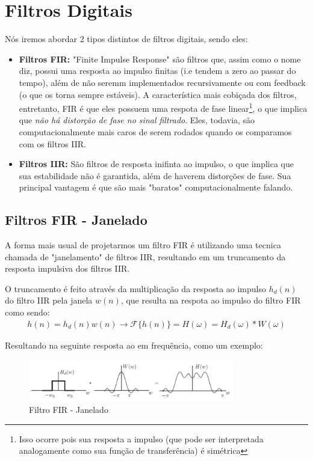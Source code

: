 \documentclass{article}
\begin{document}
\newpage
\section{Filtros Digitais}
Nós iremos abordar 2 tipos distintos de filtros digitais, sendo eles:
\begin{itemize}
    \item \textbf{Filtros FIR:} "Finite Impulse Response" são filtros que, assim como o nome diz, possui uma resposta ao impulso finitas (i.e tendem a zero ao passar do tempo), além de não seremm implementados recursivamente ou com feedback (o que os torna sempre estáveis). A característica mais cobiçada dos filtros, entretanto, FIR é que eles possuem uma respota de fase linear\footnote{Isso ocorre pois sua resposta a impulso (que pode ser interpretada analogamente como sua função de transferência) é simétrica}, o que implica que \emph{não há distorção de fase no sinal filtrado}. Eles, todavia, são computacionalmente mais caros de serem rodados quando os comparamos com os filtros IIR.
    \item \textbf{Filtros IIR:} São filtros de resposta inifinta ao impulso, o que implica que sua estabilidade não é garantida, além de haverem distorções de fase. Sua principal vantagem é que são mais "baratos" computacionalmente falando.
\end{itemize}

\subsection{Filtros FIR - Janelado}
A forma mais usual de projetarmos um filtro FIR é utilizando uma tecnica chamada de "janelamento" de filtros IIR, resultando em um truncamento da resposta impulsiva dos filtros IIR. 

O truncamento é feito através da multiplicação da resposta ao impulso $h_d(n)$ do filtro IIR pela janela $w(n)$, que resulta na respota ao impulso do filtro FIR como sendo:
\begin{align}
    h(n) = h_d(n)w(n) \longrightarrow \mathcal{F}\{h(n)\} = H(\omega) = H_d(\omega) * W(\omega)
\end{align}

Resultando na seguinte resposta ao em frequência, como um exemplo:
\begin{figure}[h]
    \centering
    \includegraphics[width=0.8\textwidth]{imgs/filtro_fir_janelado.png}
    \caption{Filtro FIR - Janelado}
\end{figure}
\end{document}
